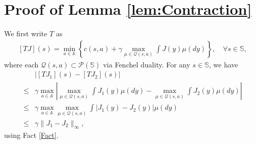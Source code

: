 \documentclass[12pt,technote,onecolumn]{IEEEtran}
\begin{document}
\section*{Proof of Lemma \ref{lem:Contraction}}
\begin{IEEEproof}
	We first write $T$ as
	\begin{equation*}
	\begin{aligned}
	\left[TJ\right]\left(s\right)
	=\min_{a\in\mathbb{A}}\left\{ c(s,a)+\gamma\max_{\mu\in\mathcal{Q}\left(s,a\right)}\int J\left(y\right)\mu\left(dy\right)\right\},\quad\forall s\in\mathbb{S},
	\end{aligned}
	\end{equation*}
	where each $\mathcal{Q}\left(s,a\right)\subset\mathcal{P}\left(\mathbb{S}\right)$
	via Fenchel duality. For any $s\in\mathbb{S}$, we have 
	\begin{equation*}
	\begin{aligned}
	&\left|\left[TJ_{1}\right]\left(s\right)-\left[TJ_{2}\right]\left(s\right)\right|\\
	\leq&\gamma\max_{a\in\mathbb{A}}\left|\max_{\mu\in\mathcal{Q}\left(s,a\right)}\int J_{1}\left(y\right)\mu\left(dy\right)-\max_{\mu\in\mathcal{Q}\left(s,a\right)}\int J_{2}\left(y\right)\mu\left(dy\right)\right|\\
	\leq&  \gamma\max_{a\in\mathbb{A}}\max_{\mu\in\mathcal{Q}\left(s,a\right)}\int|J_{1}\left(y\right)-J_{2}\left(y\right)|\mu\left(dy\right)\\
	\leq&\gamma\|J_{1}-J_{2}\|_{\infty},
	\end{aligned}
	\end{equation*}
	using Fact \ref{Fact}. 
\end{IEEEproof}
\end{document}

